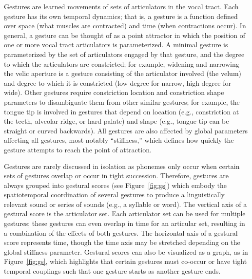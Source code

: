 Gestures are learned movements
of sets of articulators in the vocal tract.
Each gesture has its own temporal dynamics;
that is, a gesture is a function defined
over space (what muscles are contracted)
and time (when contractions occur).
In general, a gesture can be thought of
as a point attractor
in which the position
of one or more vocal tract
articulators is parameterized.
A minimal gesture is parameterized by
the set of articulators engaged
by that gesture,
and the degree to which
the articulators are constricted;
for example,
widening and narrowing the velic aperture
is a gesture consisting of
the articulator involved
(the velum)
and degree to which it is constricted
(low degree for narrow, high degree for wide).
Other gestures require constriction location
and constriction shape parameters
to disambiguate them from other similar gestures;
for example, the tongue tip
is involved in gestures
that depend on location
(e.g., constriction at
the teeth, alveolar ridge, or hard palate)
and shape
(e.g., tongue tip can be straight
or curved backwards).
All gestures are also affected by
global parameters affecting all gestures,
most notably ``stiffness,''
which defines how quickly
the gesture attempts to reach
the point of attraction.

Gestures are rarely discussed in isolation
as phonemes only occur when certain
sets of gestures overlap
or occur in tight succession.
Therefore, gestures are always
grouped into gestural scores
(see Figure~\ref{fig:gs})
which embody the spatiotemporal
coordination of several gestures
to produce a linguistically
relevant sound or series of sounds
(e.g., a syllable or word).
The vertical axis of a gestural score
is the articulator set.
Each articulator set
can be used for multiple gestures;
these gestures can even overlap in time
for an articular set,
resulting in a combination
of the effects of both gestures.
The horizontal axis of
a gestural score represents time,
though the time axis may be
stretched depending on
the global stiffness parameter.
Gestural scores can also
be visualized as a graph,
as in Figure~\ref{fig:gs},
which highlights that
certain gestures must co-occur
or have tight temporal couplings
such that one gesture
starts as another gesture ends.


